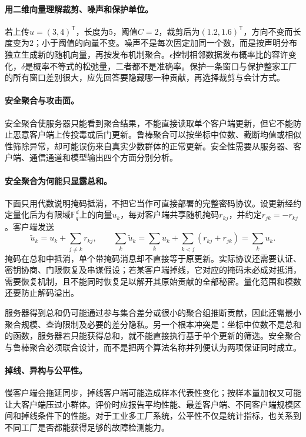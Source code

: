 \paragraph{用二维向量理解裁剪、噪声和保护单位。}
若上传$u=(3,4)^{\mathsf T}$，长度为$5$，阈值$C=2$，裁剪后为$(1.2,1.6)^{\mathsf T}$，方向不变而长度变为$2$；小于阈值的向量不变。噪声不是每次固定加同一个数，而是按声明分布独立生成新的随机向量，再按发布机制聚合。$\epsilon$控制相邻数据发布概率比的容许变化，$\delta$是概率不等式的松弛量，二者都不是准确率。保护一条窗口与保护整家工厂的所有窗口差别很大，应先回答要隐藏哪一种贡献，再选择裁剪与会计方式。

\paragraph{安全聚合与攻击面。}
安全聚合使服务器只能看到聚合结果，不能直接读取单个客户端更新，但它不能防止恶意客户端上传投毒或后门更新。鲁棒聚合可以按坐标中位数、截断均值或相似性筛除异常，却可能误伤来自真实少数群体的正常更新。安全性需要从服务器、客户端、通信通道和模型输出四个方面分别分析。

\paragraph{安全聚合为何能只显露总和。}
下面只用代数说明掩码抵消，不把它当作可直接部署的完整密码协议。设更新经约定量化后为有限域$\mathbb F_q^d$上的向量$u_k$，每对客户端共享随机掩码$r_{kj}$，并约定$r_{jk}=-r_{kj}$。客户端发送
\begin{equation}
 \widetilde u_k=u_k+\sum_{j\ne k}r_{kj},\qquad
 \sum_k\widetilde u_k=\sum_ku_k+
 \sum_{k<j}(r_{kj}+r_{jk})=\sum_ku_k.
\end{equation}
掩码在总和中抵消，单个带掩码消息却不直接等于原更新。实际协议还需要认证、密钥协商、门限恢复及串谋假设；若某客户端掉线，它对应的掩码未必成对抵消，需要恢复机制，且不能同时恢复足以解开其原始贡献的全部秘密。量化范围和模数还要防止解码溢出。

服务器得到总和仍可能通过参与集合差分或很小的聚合组推断贡献，因此还需最小聚合规模、查询限制及必要的差分隐私。另一个根本冲突是：坐标中位数不是总和的函数，服务器若只能获得总和，就不能直接执行基于单个更新的筛选。安全聚合与鲁棒聚合必须联合设计，而不是把两个算法名称并列便认为两项保证同时成立。

\paragraph{掉线、异构与公平性。}
慢客户端会拖延同步，掉线客户端可能造成样本代表性变化；按样本量加权又可能让大客户端压过小群体。评价时应报告平均性能、最差客户端、不同客户端规模区间和掉线条件下的性能。对于工业多工厂系统，公平性不仅是统计指标，也关系到不同工厂是否都能获得足够的故障检测能力。


